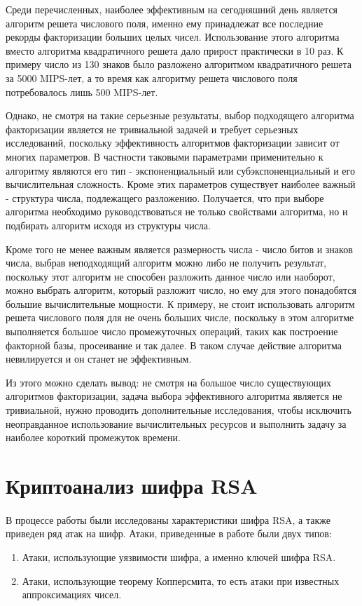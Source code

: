 	Среди перечисленных, наиболее эффективным на сегодняшний день является алгоритм решета числового поля, именно ему принадлежат все последние рекорды факторизации больших целых чисел. Использование этого алгоритма вместо алгоритма квадратичного решета дало прирост практически в 10 раз.
	К примеру число из 130 знаков было разложено алгоритмом квадратичного решета за 5000 MIPS-лет, а то время как алгоритму решета числового поля потребовалось лишь 500 MIPS-лет.

	Однако, не смотря на такие серьезные результаты, выбор подходящего алгоритма факторизации является не тривиальной задачей и требует серьезных исследований, поскольку эффективность алгоритмов факторизации зависит от многих параметров. В частности таковыми параметрами применительно к алгоритму являются его тип - экспоненциальный или субэкспоненциальный и его вычислительная сложность. Кроме этих параметров существует наиболее важный - структура числа, подлежащего разложению. Получается, что при выборе алгоритма необходимо руководствоваться не только свойствами алгоритма, но и подбирать алгоритм исходя из структуры числа. 

	Кроме того не менее важным является размерность числа - число битов и знаков числа, выбрав неподходящий алгоритм можно либо не получить результат, поскольку этот алгоритм не способен разложить данное число или наоборот, можно выбрать алгоритм, который разложит число, но ему для этого понадобятся большие вычислительные мощности. К примеру, не стоит использовать алгоритм решета числового поля для не очень больших числе, поскольку в этом алгоритме выполняется большое число промежуточных операций, таких как построение факторной базы, просеивание и так далее. В таком случае действие алгоритма невилируется и он станет не эффективным.

	Из этого можно сделать вывод: не смотря на большое число существующих алгоритмов факторизации, задача выбора эффективного алгоритма является не тривиальной, нужно проводить дополнительные исследования, чтобы исключить неоправданное использование вычислительных ресурсов и выполнить задачу за наиболее короткий промежуток времени.

\section*{Криптоанализ шифра RSA}

	\paragraph{} В процессе работы были исследованы характеристики шифра RSA, а также приведен ряд атак на шифр. Атаки, приведенные в работе были двух типов:
		\begin{enumerate}
			\item Атаки, использующие уязвимости шифра, а именно ключей шифра RSA.
			\item Атаки, использующие теорему Копперсмита, то есть атаки при известных аппроксимациях чисел.
		\end{enumerate}

